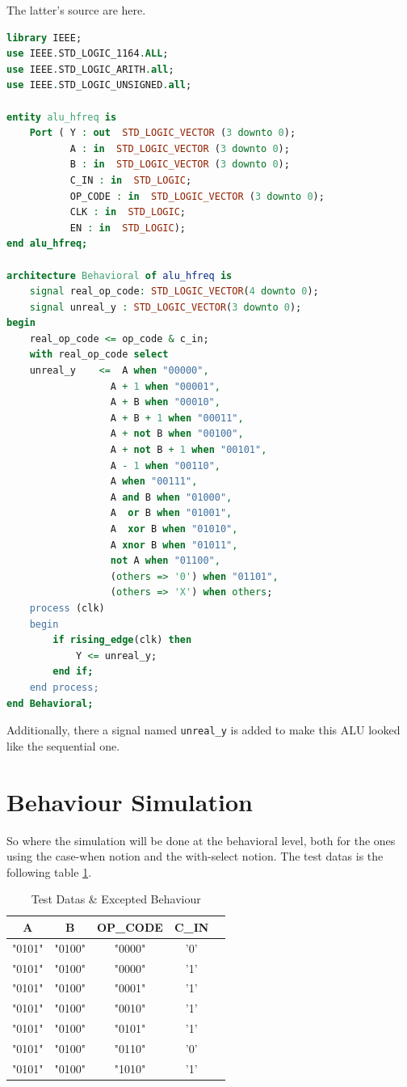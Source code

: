 \documentclass{article}
\begin{document}
    The latter's source are here.
    \begin{lstlisting}[language=VHDL]
library IEEE;
use IEEE.STD_LOGIC_1164.ALL;
use IEEE.STD_LOGIC_ARITH.all;
use IEEE.STD_LOGIC_UNSIGNED.all;

entity alu_hfreq is
    Port ( Y : out  STD_LOGIC_VECTOR (3 downto 0);
           A : in  STD_LOGIC_VECTOR (3 downto 0);
           B : in  STD_LOGIC_VECTOR (3 downto 0);
           C_IN : in  STD_LOGIC;
           OP_CODE : in  STD_LOGIC_VECTOR (3 downto 0);
           CLK : in  STD_LOGIC;
           EN : in  STD_LOGIC);
end alu_hfreq;

architecture Behavioral of alu_hfreq is
	signal real_op_code: STD_LOGIC_VECTOR(4 downto 0);
	signal unreal_y : STD_LOGIC_VECTOR(3 downto 0);
begin
	real_op_code <= op_code & c_in;
	with real_op_code select
	unreal_y	<=	A when "00000",
				  A + 1 when "00001",
				  A + B when "00010",
				  A + B + 1 when "00011",
				  A + not B when "00100",
				  A + not B + 1 when "00101",
				  A - 1 when "00110",
				  A when "00111",
				  A and B when "01000",
				  A  or B when "01001",
				  A  xor B when "01010",
				  A xnor B when "01011",
				  not A when "01100",
				  (others => '0') when "01101",
				  (others => 'X') when others;
	process (clk)
	begin
		if rising_edge(clk) then
			Y <= unreal_y;
		end if;
	end process;
end Behavioral;
    \end{lstlisting}
    
    Additionally, there a signal named \verb|unreal_y| is added to make this ALU looked like the sequential one.

    \section{Behaviour Simulation}
    \label{sec:simu:be}

    So where the simulation will be done at the behavioral level, both for the ones using the case-when notion and 
    the with-select notion.
    The test datas is the following table \ref{tab:testdatas}.

    \begin{table}
      \centering
      \begin{tabular}{|c|c|c|c|c|}
        \hline
        A & B & OP\_CODE & C_IN \\
        \hline
        "0101" & "0100" & "0000" & '0' \\
        \hline
        "0101" & "0100" & "0000" & '1' \\
        \hline
        "0101" & "0100" & "0001" & '1' \\
        \hline
        "0101" & "0100" & "0010" & '1' \\
        \hline
        "0101" & "0100" & "0101" & '1' \\
        \hline
        "0101" & "0100" & "0110" & '0' \\
        \hline
        "0101" & "0100" & "1010" & '1' \\
        \hline
      \end{tabular}
      \caption{Test Datas \& Excepted Behaviour}
      \label{tab:testdatas}
    \end{table}
\end{document}
